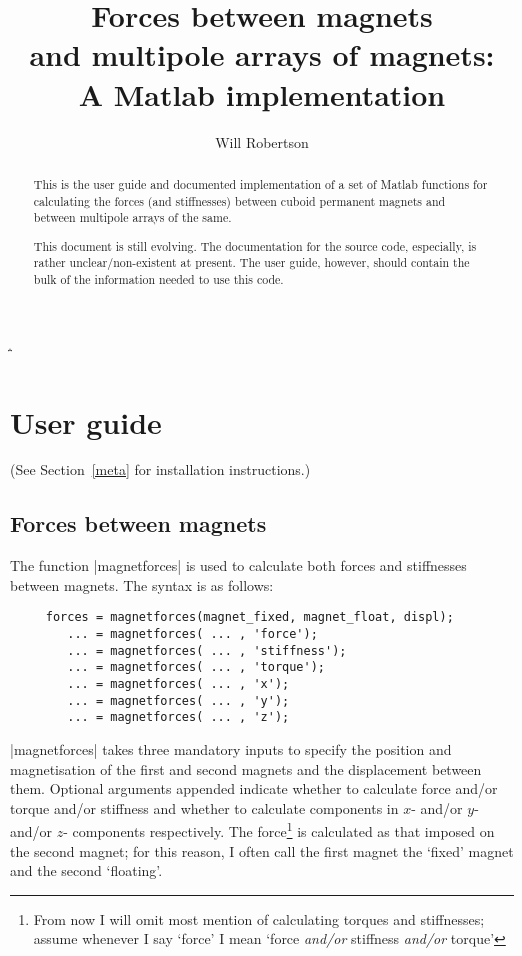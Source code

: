 \documentclass{article}
\begin{document}
\MakeShortVerb\|
\MakeShortVerb\"
\title{Forces between magnets\\ and multipole arrays of magnets:\\ A Matlab implementation}
\author{Will Robertson}
\maketitle
\vfil
\begin{abstract}
This is the user guide and documented implementation of a set of
Matlab functions for calculating the forces (and stiffnesses) between
cuboid permanent magnets and between multipole arrays of the same.

This document is still evolving. The documentation for the source code,
especially, is rather unclear/non-existent at present. The user guide,
however, should contain the bulk of the information needed to use this code.
\end{abstract}

\newpage
\tableofcontents

\newpage

\section{User guide}

(See Section~\ref{meta} for installation instructions.)

\subsection{Forces between magnets}

The function |magnetforces| is used to calculate both forces and stiffnesses
between magnets. The syntax is as follows:

\begin{verbatim}
     forces = magnetforces(magnet_fixed, magnet_float, displ);
        ... = magnetforces( ... , 'force');
        ... = magnetforces( ... , 'stiffness');
        ... = magnetforces( ... , 'torque');
        ... = magnetforces( ... , 'x');
        ... = magnetforces( ... , 'y');
        ... = magnetforces( ... , 'z');
\end{verbatim}

|magnetforces| takes three mandatory inputs to specify the position and magnetisation of the first and second magnets and the displacement between them.
Optional arguments appended indicate whether to calculate force and/or torque and/or stiffness and whether to calculate components in $x$- and/or $y$- and/or $z$- components respectively.
The force\footnote{From now I will omit most mention of calculating torques and stiffnesses; assume whenever I say `force' I mean `force \emph{and/or} stiffness \emph{and/or} torque'} is calculated as that imposed on the second magnet; for this reason, I often call the first magnet the `fixed' magnet and the second `floating'.
\end{document}
